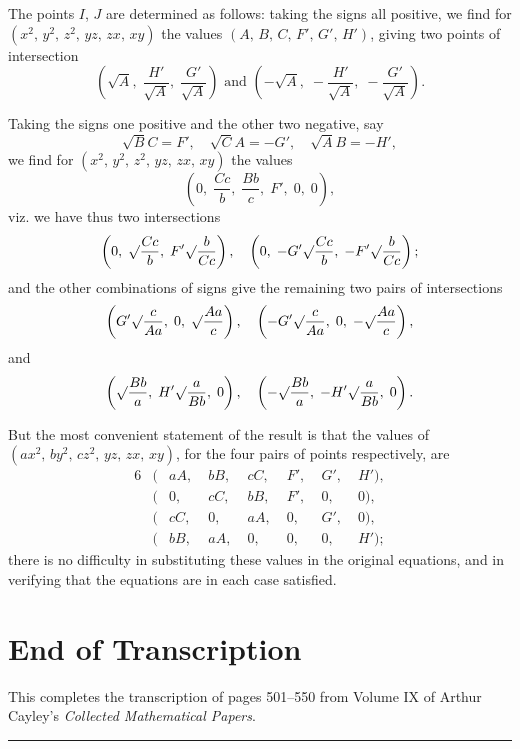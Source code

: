 \documentclass[11pt,a4paper]{article}
\theoremstyle{plain}
\theoremstyle{definition}
\theoremstyle{remark}
\begin{document}
The points $I$, $J$ are determined as follows: taking the signs all positive, we find for $(x^2,\, y^2,\, z^2,\, yz,\, zx,\, xy)$ the values $(A,\, B,\, C,\, F',\, G',\, H')$, giving two points of intersection
\[
\left(\surd A,\; \frac{H'}{\surd A},\; \frac{G'}{\surd A}\right) \text{ and } \left(-\surd A,\; -\frac{H'}{\surd A},\; -\frac{G'}{\surd A}\right).
\]

Taking the signs one positive and the other two negative, say
\[
\surd BC = F',\quad \surd CA = -G',\quad \surd AB = -H',
\]
we find for $(x^2,\, y^2,\, z^2,\, yz,\, zx,\, xy)$ the values
\[
\left(0,\; \frac{Cc}{b},\; \frac{Bb}{c},\; F',\; 0,\; 0\right),
\]
viz. we have thus two intersections
\[
\left(0,\; \surd\frac{Cc}{b},\; F'\surd\frac{b}{Cc}\right),\quad \left(0,\; -G'\surd\frac{Cc}{b},\; -F'\surd\frac{b}{Cc}\right);
\]
and the other combinations of signs give the remaining two pairs of intersections
\[
\left(G'\surd\frac{c}{Aa},\; 0,\; \surd\frac{Aa}{c}\right),\quad \left(-G'\surd\frac{c}{Aa},\; 0,\; -\surd\frac{Aa}{c}\right),
\]
and
\[
\left(\surd\frac{Bb}{a},\; H'\surd\frac{a}{Bb},\; 0\right),\quad \left(-\surd\frac{Bb}{a},\; -H'\surd\frac{a}{Bb},\; 0\right).
\]

But the most convenient statement of the result is that the values of $(ax^2,\, by^2,\, cz^2,\, yz,\, zx,\, xy)$, for the four pairs of points respectively, are
\begin{alignat*}{6}
&(&aA,\; &bB,\; &cC,\; &F',\; &G',\; &H'),\\
&(&0,\; &cC,\; &bB,\; &F',\; &0,\; &0),\\
&(&cC,\; &0,\; &aA,\; &0,\; &G',\; &0),\\
&(&bB,\; &aA,\; &0,\; &0,\; &0,\; &H');
\end{alignat*}
there is no difficulty in substituting these values in the original equations, and in verifying that the equations are in each case satisfied.

\newpage
\section*{End of Transcription}

This completes the transcription of pages 501--550 from Volume IX of Arthur Cayley's \textit{Collected Mathematical Papers}.

\vspace{1em}
\noindent\rule{\textwidth}{0.4pt}
\vspace{0.5em}
\end{document}
